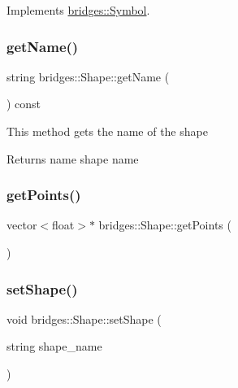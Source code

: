 Implements \mbox{\hyperlink{classbridges_1_1_symbol_a6eb190dc71b31b344b7610a07c6dc1d5}{bridges\+::\+Symbol}}.

\mbox{\label{classbridges_1_1_shape_a0365e2488fdaca0a2815be49dec93105}} 
\subsubsection{\texorpdfstring{get\+Name()}{getName()}}
{\footnotesize\ttfamily string bridges\+::\+Shape\+::get\+Name (\begin{DoxyParamCaption}{ }\end{DoxyParamCaption}) const\hspace{0.3cm}{\ttfamily [inline]}}

This method gets the name of the shape

\begin{DoxyReturn}{Returns}
name shape name 
\end{DoxyReturn}
\mbox{\label{classbridges_1_1_shape_a564705d44df51d18e12c35304f5f678c}} 
\subsubsection{\texorpdfstring{get\+Points()}{getPoints()}}
{\footnotesize\ttfamily vector$<$float$>$$\ast$ bridges\+::\+Shape\+::get\+Points (\begin{DoxyParamCaption}{ }\end{DoxyParamCaption})\hspace{0.3cm}{\ttfamily [inline]}}

\mbox{\label{classbridges_1_1_shape_aed60b6e9a673eebc2b53d9053227a7c5}} 
\subsubsection{\texorpdfstring{set\+Shape()}{setShape()}}
{\footnotesize\ttfamily void bridges\+::\+Shape\+::set\+Shape (\begin{DoxyParamCaption}\item[{string}]{shape\+\_\+name }\end{DoxyParamCaption})\hspace{0.3cm}{\ttfamily [inline]}}

